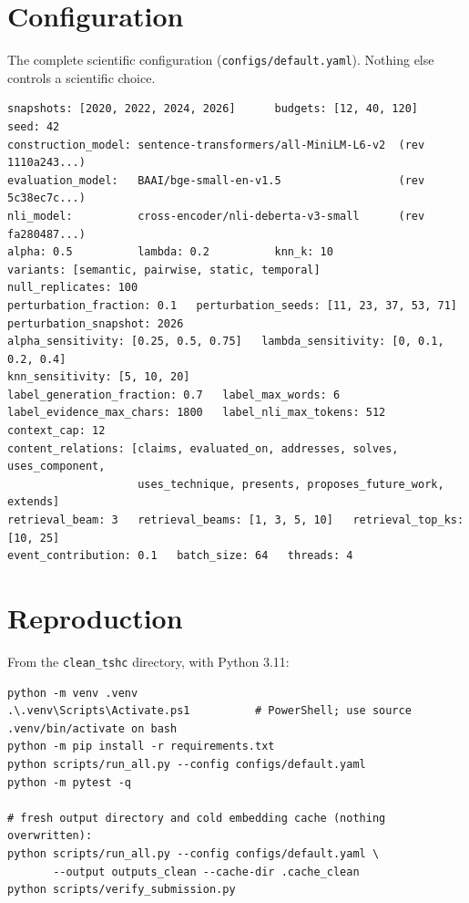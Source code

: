 \documentclass[11pt,a4paper]{article}
\theoremstyle{remark}
\newcommand{\code}[1]{\texttt{\small #1}}
\begin{document}
\clearpage
\appendix
\section{Configuration}
\label{app:config}

The complete scientific configuration (\code{configs/default.yaml}). Nothing else controls a
scientific choice.

\begin{tcolorbox}[colback=white,colframe=gray!60,boxrule=0.4pt,arc=1pt]
\footnotesize
\begin{verbatim}
snapshots: [2020, 2022, 2024, 2026]      budgets: [12, 40, 120]      seed: 42
construction_model: sentence-transformers/all-MiniLM-L6-v2  (rev 1110a243...)
evaluation_model:   BAAI/bge-small-en-v1.5                  (rev 5c38ec7c...)
nli_model:          cross-encoder/nli-deberta-v3-small      (rev fa280487...)
alpha: 0.5          lambda: 0.2          knn_k: 10
variants: [semantic, pairwise, static, temporal]
null_replicates: 100
perturbation_fraction: 0.1   perturbation_seeds: [11, 23, 37, 53, 71]
perturbation_snapshot: 2026
alpha_sensitivity: [0.25, 0.5, 0.75]   lambda_sensitivity: [0, 0.1, 0.2, 0.4]
knn_sensitivity: [5, 10, 20]
label_generation_fraction: 0.7   label_max_words: 6
label_evidence_max_chars: 1800   label_nli_max_tokens: 512
context_cap: 12
content_relations: [claims, evaluated_on, addresses, solves, uses_component,
                    uses_technique, presents, proposes_future_work, extends]
retrieval_beam: 3   retrieval_beams: [1, 3, 5, 10]   retrieval_top_ks: [10, 25]
event_contribution: 0.1   batch_size: 64   threads: 4
\end{verbatim}
\end{tcolorbox}

\section{Reproduction}
\label{app:repro}

From the \code{clean\_tshc} directory, with Python 3.11:

\begin{tcolorbox}[colback=white,colframe=gray!60,boxrule=0.4pt,arc=1pt]
\footnotesize
\begin{verbatim}
python -m venv .venv
.\.venv\Scripts\Activate.ps1          # PowerShell; use source .venv/bin/activate on bash
python -m pip install -r requirements.txt
python scripts/run_all.py --config configs/default.yaml
python -m pytest -q

# fresh output directory and cold embedding cache (nothing overwritten):
python scripts/run_all.py --config configs/default.yaml \
       --output outputs_clean --cache-dir .cache_clean
python scripts/verify_submission.py
\end{verbatim}
\end{tcolorbox}
\end{document}

